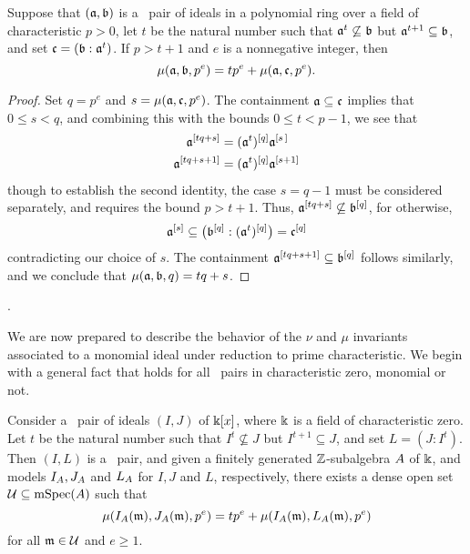 \documentclass{article}
\begin{document}
\begin{lemma} 
\label{compatible to small compatible: L}
 Suppose that $(\mathfrak{a}, \mathfrak{b})$ is a \compatible\ pair of ideals in a polynomial ring over a field of characteristic $p>0$, let $t$ be the natural number such that $\mathfrak{a}^t \not \subseteq \mathfrak{b}$ but $\mathfrak{a}^{t+1} \subseteq \mathfrak{b}$, and set $\mathfrak{c} = (\mathfrak{b} : \mathfrak{a}^t)$.   If $p > t+1$ and $e$ is a nonnegative integer, then
\[ \mu(\mathfrak{a}, \mathfrak{b}, p^e) = t p^e + \mu(\mathfrak{a}, \mathfrak{c}, p^e). \] 
\end{lemma}

\begin{proof}  Set $q=p^e$ and $s=\mu(\mathfrak{a}, \mathfrak{c}, p^e)$.  The containment $\mathfrak{a} \subseteq \mathfrak{c}$ implies that $0 \leq s < q$, and combining this with the bounds $0 \le t < p-1$, we see that 
%
\begin{align*}
\mathfrak{a}^{[tq+s]} & = (\mathfrak{a}^t)^{[q]} \mathfrak{a}^{[s \, ]} \\ 
 \mathfrak{a}^{[tq+s+1]} & = (\mathfrak{a}^t)^{[q]} \mathfrak{a}^{[s+1]}
\end{align*}
%
though to establish the second identity, the case $s=q-1$ must be considered separately, and requires the bound $p>t+1$.  Thus, $\mathfrak{a}^{[tq+s]} \not \subseteq \mathfrak{b}^{[q]}$, for otherwise, \[ \mathfrak{a}^{[s]} \subseteq \big(\mathfrak{b}^{[q]} : (\mathfrak{a}^t)^{[q]}\big) = \mathfrak{c}^{[q]}\]  contradicting our choice of $s$.  The containment $\mathfrak{a}^{[tq+s+1]} \subseteq \mathfrak{b}^{[q]}$ follows similarly, and we conclude that $\mu(\mathfrak{a},\mathfrak{b},q) = tq + s$. 
\end{proof}.

We are now prepared to describe the behavior of the $\nu$ and $\mu$ invariants associated to a monomial ideal under reduction to prime characteristic.  We begin with a general fact that holds for all \compatible\ pairs in characteristic zero, monomial or not.

\begin{proposition}
\label{general-compatible->smalll: P}
  Consider a \compatible\ pair of ideals $(I,J)$ of $\Bbbk[x]$, where $\Bbbk$ is a field of characteristic zero. Let $t$ be the natural number such that $I^t \not \subseteq J$ but $I^{t+1} \subseteq J$, and set $L=(J: I^t)$.  Then $(I,L)$ is a \smallcompatible\ pair, and given a finitely generated $\mathbb{Z}$-subalgebra $A$ of $\Bbbk$, and models $I_A, J_A$ and $L_A$ for $I,J$ and $L$, respectively, there exists a dense open set $\mathcal{U} \subseteq \operatorname{mSpec}(A)$ such that
%
\[ \mu(I_A(\mathfrak{m}), J_A(\mathfrak{m}), p^e) = t p^e + \mu(I_A(\mathfrak{m}), L_A(\mathfrak{m}), p^e) \] 
%
for all $\mathfrak{m} \in \mathcal{U}$ and $e \geq 1$.
\end{proposition}
\end{document}
